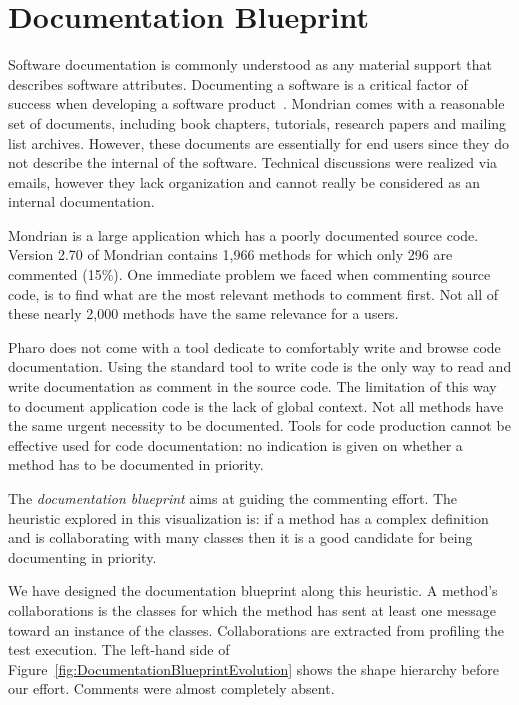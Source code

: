 \documentclass[runningheads]{llncs}
\newcommand{\seclabel}[1]{\label{sec:#1}}
\newcommand{\figref}[1]{Figure~\ref{fig:#1}}
\begin{document}
\section{Documentation Blueprint}\seclabel{documentationblueprint}

Software documentation is commonly understood as any material support that describes software attributes. Documenting a software is a critical factor of success when developing a software product~\cite{Paul03a}. 
Mondrian comes with a reasonable set of documents, including book chapters, tutorials, research papers and mailing list archives. However, these documents are essentially for end users since they do not describe the internal of the software. Technical discussions were realized via emails, however they lack organization and cannot really be considered as an internal documentation. 

Mondrian is a large application which has a poorly documented source code. Version 2.70 of Mondrian contains 1,966 methods for which only 296 are commented (15\%). One immediate problem we faced when commenting source code, is to find what are the most relevant methods to comment first. Not all of these nearly 2,000 methods have the same relevance for a users.

Pharo does not come with a tool dedicate to comfortably write and browse code documentation. Using the standard tool to write code is the only way to read and write documentation as comment in the source code. The limitation of this way to document application code is the lack of global context. Not all methods have the same urgent necessity to be documented. Tools for code production cannot be effective used for code documentation: no indication is given on whether a method has to be documented in priority. 

The \emph{documentation blueprint} aims at guiding the commenting effort. The heuristic explored in this visualization is: if a method has a complex definition and is collaborating with many classes then it is a good candidate for being documenting in priority.

We have designed the documentation blueprint along this heuristic. A method's collaborations is the classes for which the method has sent at least one message toward an instance of the classes. Collaborations are extracted from profiling the test execution.
The left-hand side of \figref{DocumentationBlueprintEvolution} shows the shape hierarchy before our effort. Comments were almost completely absent.
\end{document}
